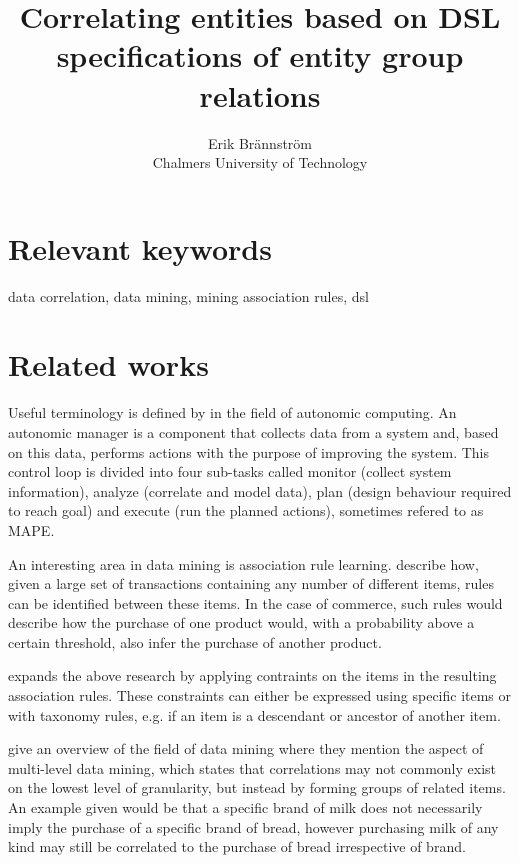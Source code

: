 \documentclass[a4paper]{article}
\begin{document}
\title{Correlating entities based on DSL specifications of entity group relations}
\author{Erik Brännström\\
  Chalmers University of Technology}
\date{}
\maketitle

\section{Relevant keywords}
data correlation, data mining, mining association rules, dsl

\section{Related works}
Useful terminology is defined by \citet{IBM2006} in the field of autonomic computing. An autonomic manager is a component that 
collects data from a system and, based on this data, performs actions with the purpose of improving the system. This control 
loop is divided into four sub-tasks called monitor (collect system information), analyze (correlate and model data), plan 
(design behaviour required to reach goal) and execute (run the planned actions), sometimes refered to as MAPE.

An interesting area in data mining is association rule learning. \citet{Agrawal1993} describe how, given a large set of 
transactions containing any number of different items, rules can be identified between these items. In the case of commerce, 
such rules would describe how the purchase of one product would, with a probability above a certain threshold, also infer 
the purchase of another product.

\citet{Srikant1997} expands the above research by applying contraints on the items in the resulting association rules. These 
constraints can either be expressed using specific items or with taxonomy rules, e.g. if an item is a descendant or ancestor 
of another item.

\citet{Chen1996} give an overview of the field of data mining where they mention the aspect of multi-level data mining, which 
states that correlations may not commonly exist on the lowest level of granularity, but instead by forming groups of related 
items. An example given would be that a specific brand of milk does not necessarily imply the purchase of a specific brand of 
bread, however purchasing milk of any kind may still be correlated to the purchase of bread irrespective of brand.
\end{document}
